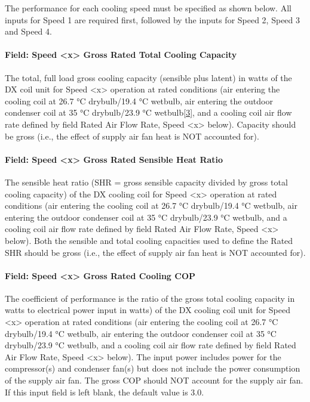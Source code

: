 The performance for each cooling speed must be specified as shown below. All inputs for Speed 1 are required first, followed by the inputs for Speed 2, Speed 3 and Speed 4.

\paragraph{Field: Speed \textless{}x\textgreater{} Gross Rated Total Cooling Capacity}\label{field-speed-x-gross-rated-total-cooling-capacity}

The total, full load gross cooling capacity (sensible plus latent) in watts of the DX coil unit for Speed \textless{}x\textgreater{} operation at rated conditions (air entering the cooling coil at 26.7 °C drybulb/19.4 °C wetbulb, air entering the outdoor condenser coil at 35 °C drybulb/23.9 °C wetbulb\protect\hyperlink{ux5fftn3}{{[}3{]}}, and a cooling coil air flow rate defined by field Rated Air Flow Rate, Speed \textless{}x\textgreater{} below). Capacity should be gross (i.e., the effect of supply air fan heat is NOT accounted for).

\paragraph{Field: Speed \textless{}x\textgreater{} Gross Rated Sensible Heat Ratio}\label{field-speed-x-gross-rated-sensible-heat-ratio}

The sensible heat ratio (SHR = gross sensible capacity divided by gross total cooling capacity) of the DX cooling coil for Speed \textless{}x\textgreater{} operation at rated conditions (air entering the cooling coil at 26.7 °C drybulb/19.4 °C wetbulb, air entering the outdoor condenser coil at 35 °C drybulb/23.9 °C wetbulb, and a cooling coil air flow rate defined by field Rated Air Flow Rate, Speed \textless{}x\textgreater{} below). Both the sensible and total cooling capacities used to define the Rated SHR should be gross (i.e., the effect of supply air fan heat is NOT accounted for).

\paragraph{Field: Speed \textless{}x\textgreater{} Gross Rated Cooling COP}\label{field-speed-x-gross-rated-cooling-cop}

The coefficient of performance is the ratio of the gross total cooling capacity in watts to electrical power input in watts) of the DX cooling coil unit for Speed \textless{}x\textgreater{} operation at rated conditions (air entering the cooling coil at 26.7 °C drybulb/19.4 °C wetbulb, air entering the outdoor condenser coil at 35 °C drybulb/23.9 °C wetbulb, and a cooling coil air flow rate defined by field Rated Air Flow Rate, Speed \textless{}x\textgreater{} below). The input power includes power for the compressor(s) and condenser fan(s) but does not include the power consumption of the supply air fan. The gross COP should NOT account for the supply air fan. If this input field is left blank, the default value is 3.0.


